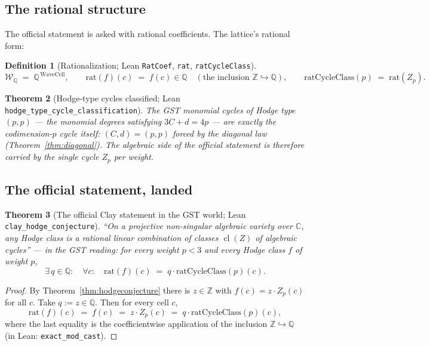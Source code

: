 \documentclass[11pt,a4paper]{article}
\theoremstyle{plain}
\newtheorem{theorem}{Theorem}[section]
\theoremstyle{definition}
\newtheorem{definition}[theorem]{Definition}
\newcommand{\Z}{\mathbb{Z}}
\newcommand{\Q}{\mathbb{Q}}
\newcommand{\C}{\mathbb{C}}
\DeclareMathOperator{\cl}{cl}
\newcommand{\cycleClass}[1]{Z_{#1}}
\begin{document}
\subsection{The rational structure}

The official statement is asked with rational coefficients. The lattice's
rational form:

\begin{definition}[Rationalization; Lean \texttt{RatCoef}, \texttt{rat},
\texttt{ratCycleClass}]
\[
  \mathcal{W}_{\Q} \;=\; \Q^{\,\mathrm{WaveCell}}, \qquad
  \mathrm{rat}(f)(c) \;=\; f(c) \in \Q \quad (\text{the inclusion }
  \Z \hookrightarrow \Q), \qquad
  \mathrm{ratCycleClass}(p) \;=\; \mathrm{rat}(\cycleClass{p}).
\]
\end{definition}

\begin{theorem}[Hodge-type cycles classified; Lean
\texttt{hodge\_type\_cycle\_classification}]
The GST monomial cycles of Hodge type $(p,p)$ --- the monomial degrees
satisfying $3C + d = 4p$ --- are exactly the codimension-$p$ cycle itself:
$(C,d) = (p,p)$ forced by the diagonal law
(Theorem~\ref{thm:diagonal}). The algebraic side of the official statement
is therefore carried by the single cycle $\cycleClass{p}$ per weight.
\end{theorem}

\subsection{The official statement, landed}

\begin{theorem}[The official Clay statement in the GST world; Lean
\texttt{clay\_hodge\_conjecture}]\label{thm:clay}
\emph{``On a projective non-singular algebraic variety over $\C$, any Hodge
class is a rational linear combination of classes $\cl(Z)$ of algebraic
cycles''} --- in the GST reading: for every weight $p<3$ and every Hodge
class $f$ of weight $p$,
\[
  \exists\, q \in \Q:\quad
  \forall c:\quad
  \mathrm{rat}(f)(c) \;=\; q \cdot \mathrm{ratCycleClass}(p)(c).
\]
\end{theorem}

\begin{proof}
By Theorem~\ref{thm:hodgeconjecture} there is $z \in \Z$ with
$f(c) = z\cdot\cycleClass{p}(c)$ for all $c$. Take $q := z \in \Q$. Then for
every cell $c$,
\[
  \mathrm{rat}(f)(c) \;=\; f(c) \;=\; z\cdot\cycleClass{p}(c)
  \;=\; q \cdot \mathrm{ratCycleClass}(p)(c),
\]
where the last equality is the coefficientwise application of the inclusion
$\Z \hookrightarrow \Q$ (in Lean: \texttt{exact\_mod\_cast}).
\end{proof}
\end{document}
